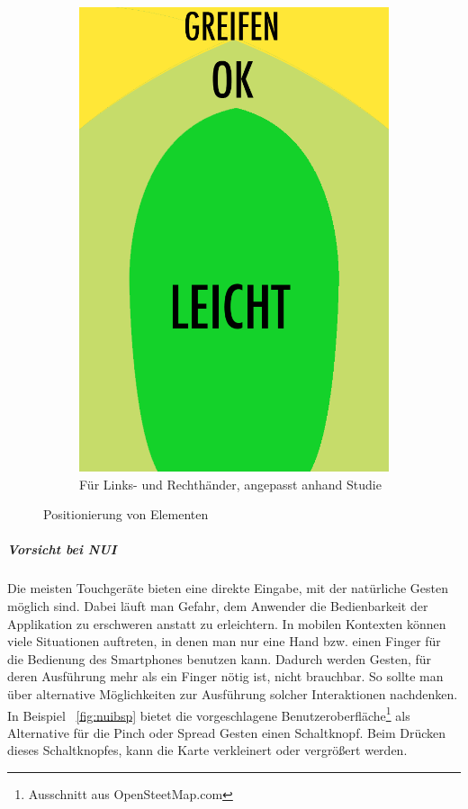 \begin{figure}
\begin{subfigure}[b]{0.3\textwidth}
			\includegraphics[width=1\textwidth]{img/anordungDerElementeForAll.png}
			\caption{Für Links- und Rechthänder, angepasst anhand Studie \cite{Park:2010tu}}\label{fig:forallPositioning}
			
	\end{subfigure}
	\caption{Positionierung von Elementen}\label{fig:elementPos}
\end{figure}


\subparagraph{Vorsicht bei NUI} 
\label{subp:benutze_nui}

Die meisten Touchgeräte bieten eine direkte Eingabe, mit der natürliche Gesten möglich sind. Dabei läuft man Gefahr, dem Anwender die Bedienbarkeit der Applikation zu erschweren anstatt zu erleichtern. In mobilen Kontexten können viele Situationen auftreten, in denen man nur eine Hand bzw. einen Finger für die Bedienung des Smartphones benutzen kann. Dadurch werden Gesten, für deren Ausführung mehr als ein Finger nötig ist, nicht brauchbar. So sollte man über alternative Möglichkeiten zur Ausführung solcher Interaktionen nachdenken. In Beispiel ~\ref{fig:nuibsp} bietet die vorgeschlagene Benutzeroberfläche\footnote{Ausschnitt aus OpenSteetMap.com} als Alternative für die Pinch oder Spread Gesten einen Schaltknopf. Beim Drücken dieses Schaltknopfes, kann die Karte verkleinert oder vergrößert werden. 

